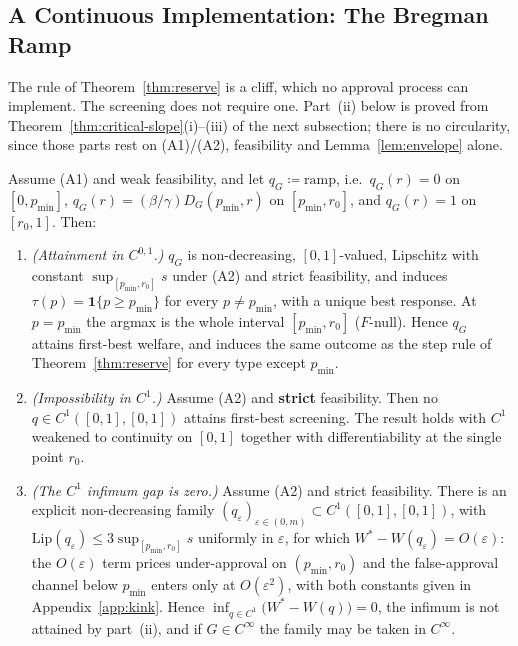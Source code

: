 \documentclass[acmsmall,nonacm,screen]{acmart}
\theoremstyle{acmplain}%
\theoremstyle{acmdefinition}%
\numberwithin{equation}{section}
\begin{document}
\subsection{A Continuous Implementation: The Bregman Ramp}

The rule of Theorem~\ref{thm:reserve} is a cliff, which no approval process can implement. The screening does not require one. Part~(ii) below is proved from Theorem~\ref{thm:critical-slope}(i)--(iii) of the next subsection; there is no circularity, since those parts rest on (A1)/(A2), feasibility and Lemma~\ref{lem:envelope} alone.

\begin{theorem}\label{thm:kink}
Assume (A1) and weak feasibility, and let $q_G \coloneqq \mathrm{ramp}$, i.e.\ $q_G(r) = 0$ on $[0,p_{\min}]$, $q_G(r) = (\beta/\gamma) D_G(p_{\min},r)$ on $[p_{\min},r_0]$, and $q_G(r) = 1$ on $[r_0,1]$. Then:
\begin{enumerate}
\item[(i)] \emph{(Attainment in $C^{0,1}$.)} $q_G$ is non-decreasing, $[0,1]$-valued, Lipschitz with constant $\sup_{[p_{\min},r_0]}s$ under (A2) and strict feasibility, and induces $\tau(p) = \mathbf 1\{p \ge p_{\min}\}$ for every $p \ne p_{\min}$, with a unique best response. At $p = p_{\min}$ the argmax is the whole interval $[p_{\min},r_0]$ ($F$-null). Hence $q_G$ attains first-best welfare, and induces the same outcome as the step rule of Theorem~\ref{thm:reserve} for every type except $p_{\min}$.
\item[(ii)] \emph{(Impossibility in $C^1$.)} Assume (A2) and \textbf{strict} feasibility. Then no $q \in C^1([0,1],[0,1])$ attains first-best screening. The result holds with $C^1$ weakened to continuity on $[0,1]$ together with differentiability at the single point $r_0$.
\item[(iii)] \emph{(The $C^1$ infimum gap is zero.)} Assume (A2) and strict feasibility. There is an explicit non-decreasing family $(q_\varepsilon)_{\varepsilon \in (0,m)} \subset C^1([0,1],[0,1])$, with $\mathrm{Lip}(q_\varepsilon) \le 3\sup_{[p_{\min},r_0]}s$ uniformly in $\varepsilon$, for which $W^* - W(q_\varepsilon) = O(\varepsilon)$: the $O(\varepsilon)$ term prices under-approval on $(p_{\min},r_0)$ and the false-approval channel below $p_{\min}$ enters only at $O(\varepsilon^2)$, with both constants given in Appendix~\ref{app:kink}. Hence $\inf_{q \in C^1}\bigl(W^* - W(q)\bigr) = 0$, the infimum is not attained by part~(ii), and if $G \in C^\infty$ the family may be taken in $C^\infty$.
\end{enumerate}
\end{theorem}
\end{document}
